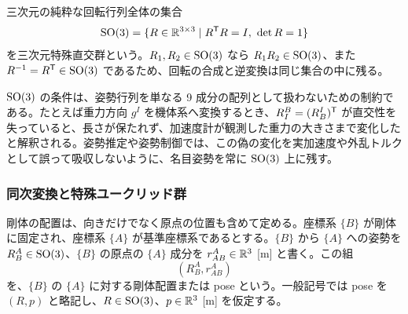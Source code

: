 \begin{definition}[特殊直交群]
三次元の純粋な回転行列全体の集合
\begin{equation}
  \operatorname{SO}(3)=\{R\in\mathbb{R}^{3\times3}\mid R^{\mathsf{T}} R=I,\ \det R=1\}
\end{equation}
を三次元特殊直交群という。$R_1,R_2\in\operatorname{SO}(3)$ なら $R_1R_2\in\operatorname{SO}(3)$、また $R^{-1}=R^{\mathsf{T}}\in\operatorname{SO}(3)$ であるため、回転の合成と逆変換は同じ集合の中に残る。
\end{definition}

$\operatorname{SO}(3)$ の条件は、姿勢行列を単なる 9 成分の配列として扱わないための制約である。たとえば重力方向 $g^I$ を機体系へ変換するとき、$R^B_I=(R^I_B)^{\mathsf{T}}$ が直交性を失っていると、長さが保たれず、加速度計が観測した重力の大きさまで変化したと解釈される。姿勢推定や姿勢制御では、この偽の変化を実加速度や外乱トルクとして誤って吸収しないように、名目姿勢を常に $\operatorname{SO}(3)$ 上に残す。

\subsubsection{同次変換と特殊ユークリッド群}

剛体の配置は、向きだけでなく原点の位置も含めて定める。座標系 $\{B\}$ が剛体に固定され、座標系 $\{A\}$ が基準座標系であるとする。$\{B\}$ から $\{A\}$ への姿勢を $R^A_B\in\operatorname{SO}(3)$、$\{B\}$ の原点の $\{A\}$ 成分を $r^A_{AB}\in\mathbb{R}^3$ [m] と書く。この組
\begin{equation}
  (R^A_B,r^A_{AB})
\end{equation}
を、$\{B\}$ の $\{A\}$ に対する剛体配置または pose という。一般記号では pose を $(R,p)$ と略記し、$R\in\operatorname{SO}(3)$、$p\in\mathbb{R}^3$ [m] を仮定する。

